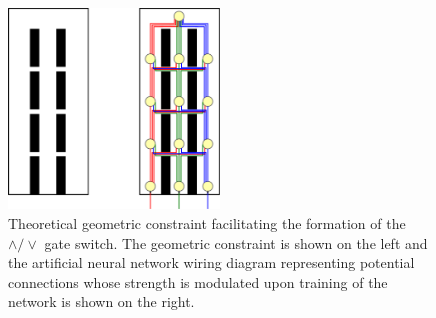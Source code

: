 
\begin{figure}
\begin{center}
\includegraphics[width=0.5\textwidth]{../fig/aogeometry.pdf}
\end{center}
\caption{Theoretical geometric constraint facilitating the formation of the $\wedge / \vee$ gate switch. The geometric constraint is shown on the left and the artificial neural network wiring diagram representing potential connections whose strength is modulated upon training of the network is shown on the right.}\label{fig:nnGeo}
\end{figure}

